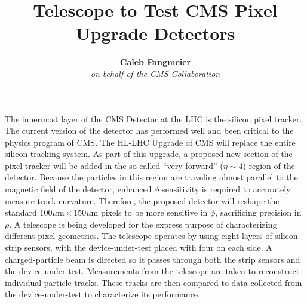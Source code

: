 \documentclass[final]{beamer}
\title{Telescope to Test CMS Pixel Upgrade Detectors} %
\author{\textbf{Caleb Fangmeier} \\
  \textit{on behalf of the CMS Collaboration}} %
\institute{Department of Physics \& Astronomy \\ \textit{University of Nebraska \-- Lincoln}} %
\begin{document}

\setlength{\belowcaptionskip}{2ex} %
\setlength\belowdisplayshortskip{2ex} %

\begin{frame}[t] %
  \small
  The innermost layer of the CMS Detector at the LHC is the silicon pixel tracker. The current version of the detector has performed well and been critical to the physics program of CMS\@.  The HL-LHC Upgrade of CMS will replace the entire silicon tracking system.  As part of this upgrade, a proposed new section of the pixel tracker will be added in the so-called ``very-forward'' ($\eta\sim4$) region of the detector. Because the particles in this region are traveling almost parallel to the magnetic field of the detector, enhanced $\phi$ sensitivity is required to accurately measure track curvature. Therefore, the proposed detector will reshape the standard $100\mu\text{m}\times150\mu\text{m}$ pixels to be more sensitive in $\phi$, sacrificing precision in $\rho$. A telescope is being developed for the express purpose of characterizing different pixel geometries.  The telescope operates by using eight layers of silicon-strip sensors, with the device-under-test placed with four on each side. A charged-particle beam is directed so it passes through both the strip sensors and the device-under-test. Measurements from the telescope are taken to reconstruct individual particle tracks. These tracks are then compared to data collected from the device-under-test to characterize its performance.
  
\vspace{.2in}


\end{frame}
\end{document}
